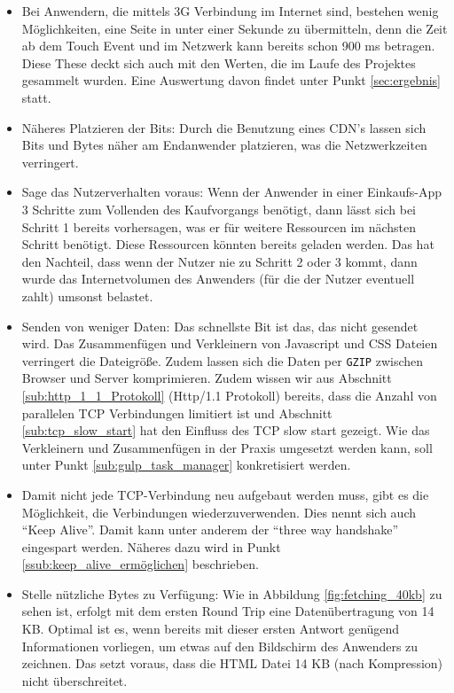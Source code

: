 \begin{itemize}
			\item Bei Anwendern, die mittels 3G Verbindung im Internet sind, bestehen wenig Möglichkeiten, eine Seite in unter einer Sekunde zu übermitteln, denn die Zeit ab dem Touch Event und im Netzwerk kann bereits schon 900 ms betragen. Diese These deckt sich auch mit den Werten, die im Laufe des Projektes gesammelt wurden. Eine Auswertung davon findet unter Punkt \ref{sec:ergebnis} statt.

			\item Näheres Platzieren der Bits: Durch die Benutzung eines CDN's lassen sich Bits und Bytes näher am Endanwender platzieren, was die Netzwerkzeiten verringert.

			\item Sage das Nutzerverhalten voraus: Wenn der Anwender in einer Einkaufs-App 3 Schritte zum Vollenden des Kaufvorgangs benötigt, dann lässt sich bei Schritt 1 bereits vorhersagen, was er für weitere Ressourcen im nächsten Schritt benötigt. Diese Ressourcen könnten bereits geladen werden. Das hat den Nachteil, dass wenn der Nutzer nie zu Schritt 2 oder 3 kommt, dann wurde das Internetvolumen des Anwenders (für die der Nutzer eventuell zahlt) umsonst belastet.

			\item Senden von weniger Daten: Das schnellste Bit ist das, das nicht gesendet wird. Das Zusammenfügen und Verkleinern von Javascript und CSS Dateien verringert die Dateigröße. Zudem lassen sich die Daten per \texttt{GZIP} zwischen Browser und Server komprimieren. Zudem wissen wir aus Abschnitt \ref{sub:http_1_1_Protokoll} (Http/1.1 Protokoll) bereits, dass die Anzahl von parallelen TCP Verbindungen limitiert ist und Abschnitt \ref{sub:tcp_slow_start} hat den Einfluss des TCP slow start gezeigt. Wie das Verkleinern und Zusammenfügen in der Praxis umgesetzt werden kann, soll unter Punkt \ref{sub:gulp_task_manager} konkretisiert werden.

			\item Damit nicht jede TCP-Verbindung neu aufgebaut werden muss, gibt es die Möglichkeit, die Verbindungen wiederzuverwenden. Dies nennt sich auch "`Keep Alive"'. Damit kann unter anderem der "`three way handshake"' eingespart werden. Näheres dazu wird in Punkt \ref{ssub:keep_alive_ermöglichen} beschrieben.

			\item Stelle nützliche Bytes zu Verfügung: Wie in Abbildung \ref{fig:fetching_40kb} zu sehen ist, erfolgt mit dem ersten Round Trip eine Datenübertragung von  14 KB. Optimal ist es, wenn bereits mit dieser ersten Antwort genügend Informationen vorliegen, um etwas auf den Bildschirm des Anwenders zu zeichnen. Das setzt voraus, dass die HTML Datei 14 KB (nach Kompression) nicht überschreitet.

		\end{itemize}

